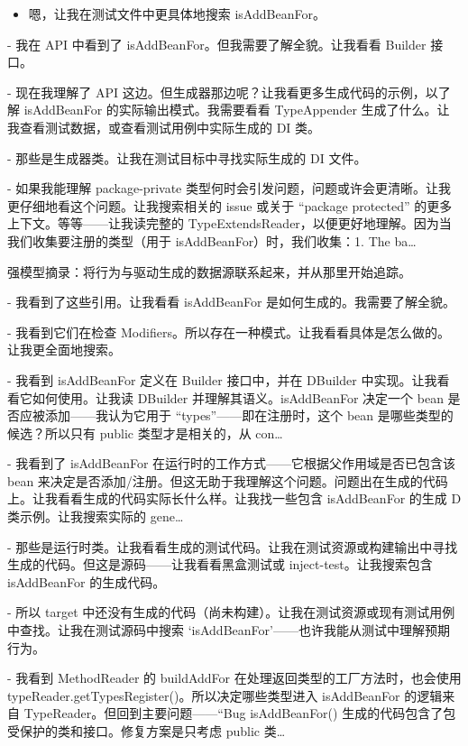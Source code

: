 \begin{itemize}
\tightlist
\item
  嗯，让我在测试文件中更具体地搜索 isAddBeanFor。
\end{itemize}



- 我在 API 中看到了 isAddBeanFor。但我需要了解全貌。让我看看 Builder 接口。

- 现在我理解了 API 这边。但生成器那边呢？让我看更多生成代码的示例，以了解 isAddBeanFor 的实际输出模式。我需要看看 TypeAppender 生成了什么。让我查看测试数据，或查看测试用例中实际生成的 DI 类。

- 那些是生成器类。让我在测试目标中寻找实际生成的 DI 文件。

- 如果我能理解 package-private 类型何时会引发问题，问题或许会更清晰。让我更仔细地看这个问题。让我搜索相关的 issue 或关于 ``package protected'' 的更多上下文。等等——让我读完整的 TypeExtendsReader，以便更好地理解。因为当我们收集要注册的类型（用于 isAddBeanFor）时，我们收集：1. The ba\ldots{}

强模型摘录：将行为与驱动生成的数据源联系起来，并从那里开始追踪。

- 我看到了这些引用。让我看看 isAddBeanFor 是如何生成的。我需要了解全貌。

- 我看到它们在检查 Modifiers。所以存在一种模式。让我看看具体是怎么做的。让我更全面地搜索。

- 我看到 isAddBeanFor 定义在 Builder 接口中，并在 DBuilder 中实现。让我看看它如何使用。让我读 DBuilder 并理解其语义。isAddBeanFor 决定一个 bean 是否应被添加——我认为它用于 ``types''——即在注册时，这个 bean 是哪些类型的候选？所以只有 public 类型才是相关的，从 con\ldots{}

- 我看到了 isAddBeanFor 在运行时的工作方式——它根据父作用域是否已包含该 bean 来决定是否添加/注册。但这无助于我理解这个问题。问题出在生成的代码上。让我看看生成的代码实际长什么样。让我找一些包含 isAddBeanFor 的生成 D 类示例。让我搜索实际的 gene\ldots{}

- 那些是运行时类。让我看看生成的测试代码。让我在测试资源或构建输出中寻找生成的代码。但这是源码——让我看看黑盒测试或 inject-test。让我搜索包含 isAddBeanFor 的生成代码。

- 所以 target 中还没有生成的代码（尚未构建）。让我在测试资源或现有测试用例中查找。让我在测试源码中搜索 `isAddBeanFor'——也许我能从测试中理解预期行为。

- 我看到 MethodReader 的 buildAddFor 在处理返回类型的工厂方法时，也会使用 typeReader.getTypesRegister()。所以决定哪些类型进入 isAddBeanFor 的逻辑来自 TypeReader。但回到主要问题——``Bug isAddBeanFor() 生成的代码包含了包受保护的类和接口。修复方案是只考虑 public 类\ldots{}
